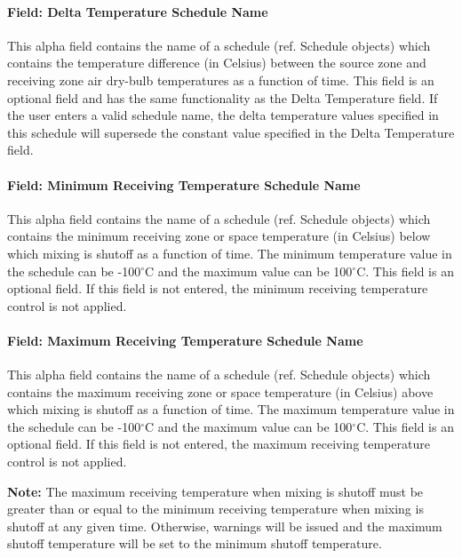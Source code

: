 \paragraph{Field: Delta Temperature Schedule Name}\label{field-delta-temperature-schedule-name-2}

This alpha field contains the name of a schedule (ref. Schedule objects) which contains the temperature difference (in Celsius) between the source zone and receiving zone air dry-bulb temperatures as a function of time. This field is an optional field and has the same functionality as the Delta Temperature field. If the user enters a valid schedule name, the delta temperature values specified in this schedule will supersede the constant value specified in the Delta Temperature field.

\paragraph{Field: Minimum Receiving Temperature Schedule Name}\label{field-minimum-zone-temperature-schedule-name}

This alpha field contains the name of a schedule (ref. Schedule objects) which contains the minimum receiving zone or space temperature (in Celsius) below which mixing is shutoff as a function of time. The minimum temperature value in the schedule can be -100$^\circ$C and the maximum value can be 100$^\circ$C. This field is an optional field. If this field is not entered, the minimum receiving temperature control is not applied.

\paragraph{Field: Maximum Receiving Temperature Schedule Name}\label{field-maximum-zone-temperature-schedule-name}

This alpha field contains the name of a schedule (ref. Schedule objects) which contains the maximum receiving zone or space temperature (in Celsius) above which mixing is shutoff as a function of time. The maximum temperature value in the schedule can be -100$^\circ$C and the maximum value can be 100$^\circ$C. This field is an optional field. If this field is not entered, the maximum receiving temperature control is not applied.

\textbf{Note:} The maximum receiving temperature when mixing is shutoff must be greater than or equal to the minimum receiving temperature when mixing is shutoff at any given time. Otherwise, warnings will be issued and the maximum shutoff temperature will be set to the minimum shutoff temperature.


